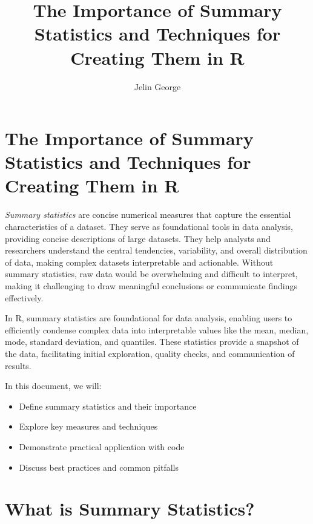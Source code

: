 \documentclass[
  man,
  floatsintext,
  longtable,
  nolmodern,
  notxfonts,
  notimes,
  colorlinks=true,linkcolor=blue,citecolor=blue,urlcolor=blue]{apa7}
\title{The Importance of Summary Statistics and Techniques for Creating
Them in R}
\author{Jelin George}
\affiliation{
{Hochschule Fresenius - University of Applied Science}}
\begin{document}
\maketitle

\hypertarget{toc}{}
\tableofcontents
\newpage
\section[Introduction]{The Importance of Summary Statistics and
Techniques for Creating Them in R}

\setcounter{secnumdepth}{-\maxdimen} %

\setlength\LTleft{0pt}


\emph{Summary statistics} are concise numerical measures that capture
the essential characteristics of a dataset. They serve as foundational
tools in data analysis, providing concise descriptions of large
datasets. They help analysts and researchers understand the central
tendencies, variability, and overall distribution of data, making
complex datasets interpretable and actionable. Without summary
statistics, raw data would be overwhelming and difficult to interpret,
making it challenging to draw meaningful conclusions or communicate
findings effectively.

In R, summary statistics are foundational for data analysis, enabling
users to efficiently condense complex data into interpretable values
like the mean, median, mode, standard deviation, and quantiles. These
statistics provide a snapshot of the data, facilitating initial
exploration, quality checks, and communication of results.

In this document, we will:

\begin{itemize}
\item
  Define summary statistics and their importance
\item
  Explore key measures and techniques
\item
  Demonstrate practical application with code
\item
  Discuss best practices and common pitfalls
\end{itemize}

\newpage

\section{What is Summary Statistics?}\label{what-is-summary-statistics}
\end{document}
